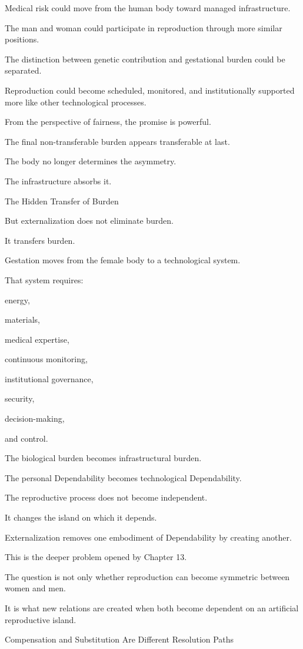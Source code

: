 Medical risk could move from the human body toward managed infrastructure.

The man and woman could participate in reproduction through more similar positions.

The distinction between genetic contribution and gestational burden could be separated.

Reproduction could become scheduled, monitored, and institutionally supported more like other technological processes.

From the perspective of fairness, the promise is powerful.

The final non-transferable burden appears transferable at last.

The body no longer determines the asymmetry.

The infrastructure absorbs it.

The Hidden Transfer of Burden

But externalization does not eliminate burden.

It transfers burden.

Gestation moves from the female body to a technological system.

That system requires:

energy,

materials,

medical expertise,

continuous monitoring,

institutional governance,

security,

decision-making,

and control.

The biological burden becomes infrastructural burden.

The personal Dependability becomes technological Dependability.

The reproductive process does not become independent.

It changes the island on which it depends.

Externalization removes one embodiment of Dependability by creating another.

This is the deeper problem opened by Chapter 13.

The question is not only whether reproduction can become symmetric between women and men.

It is what new relations are created when both become dependent on an artificial reproductive island.

Compensation and Substitution Are Different Resolution Paths

